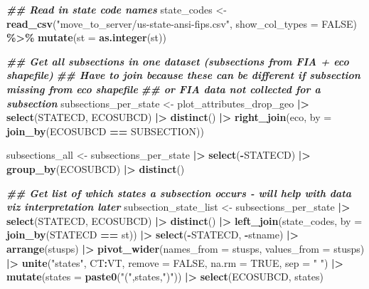 \documentclass[
]{book}
\newenvironment{Shaded}{\begin{snugshade}}{\end{snugshade}}
\newcommand{\AttributeTok}[1]{\textcolor[rgb]{0.13,0.29,0.53}{#1}}
\newcommand{\ConstantTok}[1]{\textcolor[rgb]{0.56,0.35,0.01}{#1}}
\newcommand{\DocumentationTok}[1]{\textcolor[rgb]{0.56,0.35,0.01}{\textbf{\textit{#1}}}}
\newcommand{\FunctionTok}[1]{\textcolor[rgb]{0.13,0.29,0.53}{\textbf{#1}}}
\newcommand{\NormalTok}[1]{#1}
\newcommand{\OtherTok}[1]{\textcolor[rgb]{0.56,0.35,0.01}{#1}}
\newcommand{\SpecialCharTok}[1]{\textcolor[rgb]{0.81,0.36,0.00}{\textbf{#1}}}
\newcommand{\StringTok}[1]{\textcolor[rgb]{0.31,0.60,0.02}{#1}}
\begin{document}
\begin{Shaded}
\begin{Highlighting}[]
\DocumentationTok{\#\# Read in state code names}
\NormalTok{state\_codes }\OtherTok{\textless{}{-}} \FunctionTok{read\_csv}\NormalTok{(}\StringTok{"move\_to\_server/us{-}state{-}ansi{-}fips.csv"}\NormalTok{, }\AttributeTok{show\_col\_types =} \ConstantTok{FALSE}\NormalTok{) }\SpecialCharTok{\%\textgreater{}\%}
  \FunctionTok{mutate}\NormalTok{(}\AttributeTok{st =} \FunctionTok{as.integer}\NormalTok{(st))}

\DocumentationTok{\#\# Get all subsections in one dataset (subsections from FIA + eco shapefile)}
\DocumentationTok{\#\# Have to join because these can be different if subsection missing from eco shapefile}
\DocumentationTok{\#\# or FIA data not collected for a subsection}
\NormalTok{subsections\_per\_state }\OtherTok{\textless{}{-}}\NormalTok{ plot\_attributes\_drop\_geo }\SpecialCharTok{|\textgreater{}}
  \FunctionTok{select}\NormalTok{(STATECD, ECOSUBCD) }\SpecialCharTok{|\textgreater{}}
  \FunctionTok{distinct}\NormalTok{() }\SpecialCharTok{|\textgreater{}}
  \FunctionTok{right\_join}\NormalTok{(eco, }\AttributeTok{by =} \FunctionTok{join\_by}\NormalTok{(ECOSUBCD }\SpecialCharTok{==}\NormalTok{ SUBSECTION))}

\NormalTok{subsections\_all }\OtherTok{\textless{}{-}}\NormalTok{ subsections\_per\_state }\SpecialCharTok{|\textgreater{}}
  \FunctionTok{select}\NormalTok{(}\SpecialCharTok{{-}}\NormalTok{STATECD) }\SpecialCharTok{|\textgreater{}}
  \FunctionTok{group\_by}\NormalTok{(ECOSUBCD) }\SpecialCharTok{|\textgreater{}}
  \FunctionTok{distinct}\NormalTok{()}

\DocumentationTok{\#\# Get list of which states a subsection occurs {-} will help with data viz interpretation later}
\NormalTok{subsection\_state\_list }\OtherTok{\textless{}{-}}\NormalTok{ subsections\_per\_state }\SpecialCharTok{|\textgreater{}}
  \FunctionTok{select}\NormalTok{(STATECD, ECOSUBCD) }\SpecialCharTok{|\textgreater{}}
  \FunctionTok{distinct}\NormalTok{() }\SpecialCharTok{|\textgreater{}}
  \FunctionTok{left\_join}\NormalTok{(state\_codes, }\AttributeTok{by =} \FunctionTok{join\_by}\NormalTok{(STATECD }\SpecialCharTok{==}\NormalTok{ st)) }\SpecialCharTok{|\textgreater{}}
  \FunctionTok{select}\NormalTok{(}\SpecialCharTok{{-}}\NormalTok{STATECD, }\SpecialCharTok{{-}}\NormalTok{stname) }\SpecialCharTok{|\textgreater{}}
  \FunctionTok{arrange}\NormalTok{(stusps) }\SpecialCharTok{|\textgreater{}}
  \FunctionTok{pivot\_wider}\NormalTok{(}\AttributeTok{names\_from =}\NormalTok{ stusps, }\AttributeTok{values\_from =}\NormalTok{ stusps) }\SpecialCharTok{|\textgreater{}}
  \FunctionTok{unite}\NormalTok{(}\StringTok{"states"}\NormalTok{, CT}\SpecialCharTok{:}\NormalTok{VT, }\AttributeTok{remove =} \ConstantTok{FALSE}\NormalTok{, }\AttributeTok{na.rm =} \ConstantTok{TRUE}\NormalTok{, }\AttributeTok{sep =} \StringTok{" "}\NormalTok{) }\SpecialCharTok{|\textgreater{}}
  \FunctionTok{mutate}\NormalTok{(}\AttributeTok{states =} \FunctionTok{paste0}\NormalTok{(}\StringTok{"("}\NormalTok{,states,}\StringTok{")"}\NormalTok{)) }\SpecialCharTok{|\textgreater{}}
  \FunctionTok{select}\NormalTok{(ECOSUBCD, states)}


\end{Highlighting}
\end{Shaded}
\end{document}
